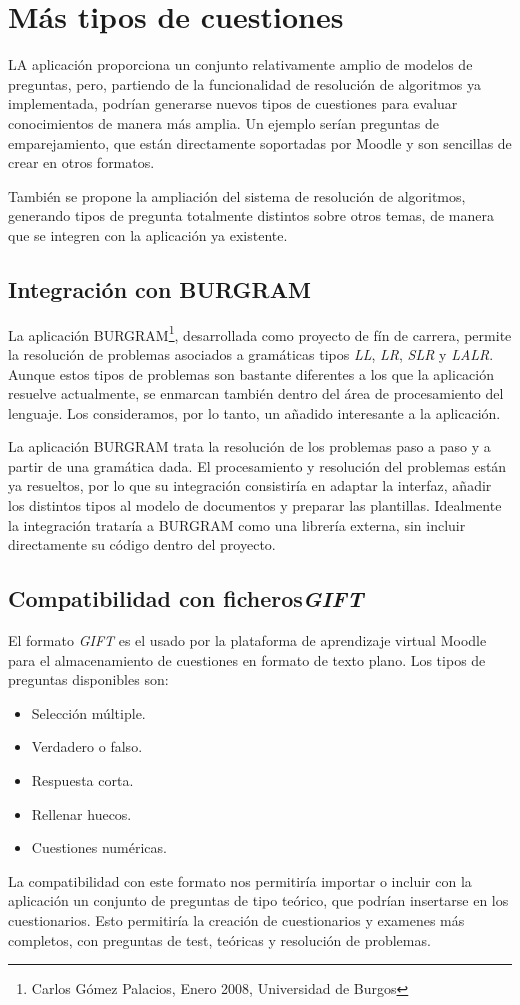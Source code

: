 \section{Más tipos de cuestiones}
LA aplicación proporciona un conjunto relativamente amplio de modelos de preguntas, pero, partiendo de la funcionalidad de resolución de algoritmos ya implementada, podrían generarse nuevos tipos de cuestiones para evaluar conocimientos de manera más amplia.
Un ejemplo serían preguntas de emparejamiento, que están directamente soportadas por Moodle y son sencillas de crear en otros formatos.

También se propone la ampliación del sistema de resolución de algoritmos, generando tipos de pregunta totalmente distintos sobre otros temas, de manera que se integren con la aplicación ya existente.

\subsection{Integración con BURGRAM}
La aplicación BURGRAM\footnote{Carlos Gómez Palacios, Enero 2008, Universidad de Burgos}, desarrollada como proyecto de fín de carrera, permite la resolución de problemas asociados a gramáticas tipos \emph{LL}, \emph{LR}, \emph{SLR} y \emph{LALR}.
Aunque estos tipos de problemas son bastante diferentes a los que la aplicación resuelve actualmente, se enmarcan también dentro del área de procesamiento del lenguaje.
Los consideramos, por lo tanto, un añadido interesante a la aplicación.

La aplicación BURGRAM trata la resolución de los problemas paso a paso y a partir de una gramática dada.
El procesamiento y resolución del problemas están ya resueltos, por lo que su integración consistiría en adaptar la interfaz, añadir los distintos tipos al modelo de documentos y preparar las plantillas.
Idealmente la integración trataría a BURGRAM como una librería externa, sin incluir directamente su código dentro del proyecto.

\subsection{Compatibilidad con ficheros\emph{GIFT}}
El formato \emph{GIFT} es el usado por la plataforma de aprendizaje virtual Moodle para el almacenamiento de cuestiones en formato de texto plano.
Los tipos de preguntas disponibles son:
\begin{itemize}
	\item Selección múltiple.
	\item Verdadero o falso.
	\item Respuesta corta.
	\item Rellenar huecos.
	\item Cuestiones numéricas.
\end{itemize}

La compatibilidad con este formato nos permitiría importar o incluir con la aplicación un conjunto de preguntas de tipo teórico, que podrían insertarse en los cuestionarios.
Esto permitiría la creación de cuestionarios y examenes más completos, con preguntas de test, teóricas y resolución de problemas.